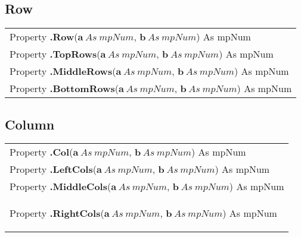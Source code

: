 \subsection{Row}
\begin{tabular}{p{481pt}}
	\toprule
	\textsf{Property \textbf{.Row}($\boldsymbol{a}\ As\ mpNum$, $\boldsymbol{b}\ As\ mpNum$) As mpNum}\index{Multiprecision Properties!.Row} \\
	\textsf{Property \textbf{.TopRows}($\boldsymbol{a}\ As\ mpNum$, $\boldsymbol{b}\ As\ mpNum$) As mpNum}\index{Multiprecision Properties!.TopRows} \\
	\textsf{Property \textbf{.MiddleRows}($\boldsymbol{a}\ As\ mpNum$, $\boldsymbol{b}\ As\ mpNum$) As mpNum}\index{Multiprecision Properties!.MiddleRows} \\
	\textsf{Property \textbf{.BottomRows}($\boldsymbol{a}\ As\ mpNum$, $\boldsymbol{b}\ As\ mpNum$) As mpNum}\index{Multiprecision Properties!.BottomRows} \\
	\bottomrule
\end{tabular}

\vspace{0.3cm}
\lipsum[2]




\subsection{Column}
\begin{tabular}{p{481pt}}
	\toprule
	\textsf{Property \textbf{.Col}($\boldsymbol{a}\ As\ mpNum$, $\boldsymbol{b}\ As\ mpNum$) As mpNum}\index{Multiprecision Properties!.Col} \\
	\textsf{Property \textbf{.LeftCols}($\boldsymbol{a}\ As\ mpNum$, $\boldsymbol{b}\ As\ mpNum$) As mpNum}\index{Multiprecision Properties!.LeftCols} \\
	\textsf{Property \textbf{.MiddleCols}($\boldsymbol{a}\ As\ mpNum$, $\boldsymbol{b}\ As\ mpNum$) As mpNum}\index{Multiprecision Properties!.MiddleCols} \\
	\hypertarget{RightCols_HT}{}
	\textsf{Property \textbf{.RightCols}($\boldsymbol{a}\ As\ mpNum$, $\boldsymbol{b}\ As\ mpNum$) As mpNum}\index{Multiprecision Properties!.RightCols} \\
	\bottomrule
\end{tabular}

\vspace{0.3cm}
\lipsum[2]



\hypertarget{FillLinearByStep_HT}{}
\hypertarget{SetRandomSymmetric_HT}{}
